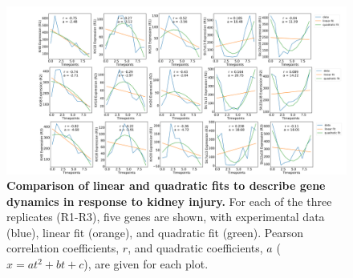\begin{center}
\begin{figure}[H]
  \includegraphics[width=\linewidth]{./figures/sl_JCI_r.png}
    \caption[Comparison of linear and quadratic fits to describe gene dynamics in response to kidney injury.]{\textbf{Comparison of linear and quadratic fits to describe gene dynamics in response to kidney injury.}
    For each of the three replicates (R1-R3), five genes are shown, with experimental data (blue), linear fit (orange), and quadratic fit (green). 
    Pearson correlation coefficients, $r$, and quadratic coefficients, $a$ ($x = at^2 + bt + c$), are given for each plot.}
  \label{fig:figS6}
\end{figure}
\end{center}
\newpage

